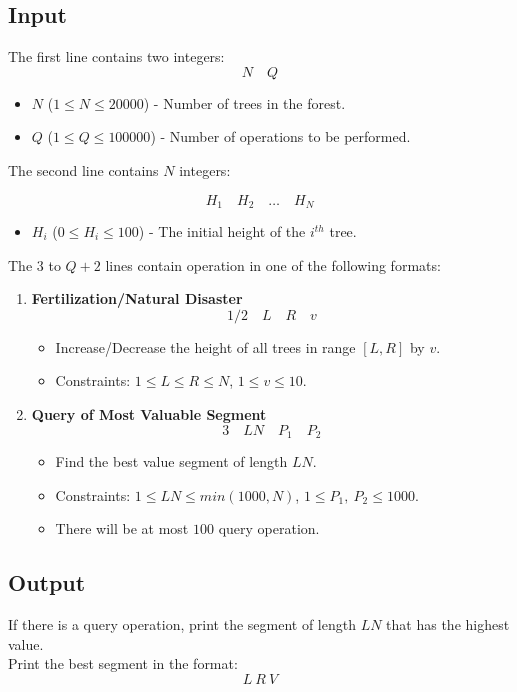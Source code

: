 \documentclass[12pt,a4paper]{article}
\begin{document}
\subsection*{\fontsize{16}{12}Input}
The first line contains two integers:
\[
N \quad Q
\]

\begin{itemize}
    \item \( N \) (\( 1 \leq N \leq 20000 \)) - Number of trees in the forest.
    \item \( Q \) (\( 1 \leq Q \leq 100000 \)) - Number of operations to be performed.
\end{itemize}
\newpage\noindent
The second line contains \(N\) integers:

\[
H_1 \quad H_2 \quad \dots \quad H_N
\]

\begin{itemize}
    \item \( H_i \) (\( 0 \leq H_i \leq 100 \)) - The initial height of the \( i^{th} \) tree.
\end{itemize}
\noindent
The $3$ to $Q+2$ lines contain operation in one of the following formats:

\begin{enumerate}
    \item \textbf{Fertilization/Natural Disaster}
    \[
    1/2 \quad L \quad R \quad v
    \]
    \begin{itemize}
        \item Increase/Decrease the height of all trees in range \( [L, R] \) by \( v \).
        \item Constraints: \( 1 \leq L \leq R \leq N \), \( 1 \leq v \leq 10 \).
    \end{itemize}
    
    \item \textbf{Query of Most Valuable Segment}
    \[
    3 \quad LN \quad P_1 \quad P_2
    \]
    \begin{itemize}
        \item Find the best value segment of length $LN$.
        \item Constraints: \( 1 \leq LN \leq min(1000, N) \), \( 1 \leq P_1,\ P_2 \leq 1000 \).
        \item There will be at most $100$ query operation.
    \end{itemize}
\end{enumerate}

\subsection*{\fontsize{16}{12}Output}
If there is a query operation, print the segment of length \( LN \) that has the highest value.\\
\noindent
Print the best segment in the format:
\[
L\ R\ V
\]
\end{document}
